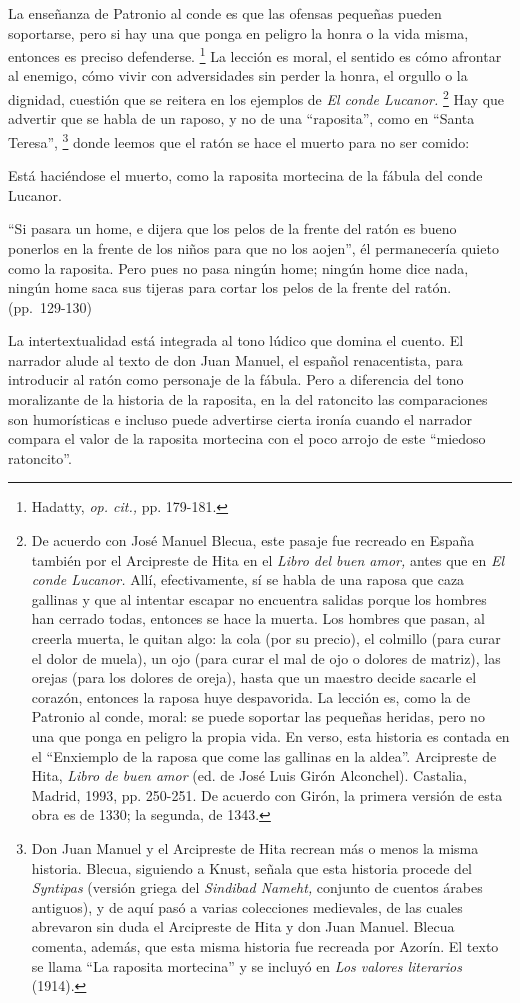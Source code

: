\documentclass[14pt,twoside,final]{extbook} %
\let\oldfootnote\footnote
\renewcommand\footnote[1]{%
\oldfootnote{\hspace{1mm}#1}}
\begin{document}
La enseñanza de Patronio al conde es que las ofensas pequeñas pueden soportarse, pero si hay una que ponga en peligro la honra o la vida misma, entonces es preciso defenderse.\footnote{Hadatty, \emph{op. cit.,} pp. 179-181. } La lección es moral, el sentido es cómo afrontar al enemigo, cómo vivir con adversidades sin perder la honra, el orgullo o la dignidad, cuestión que se reitera en los ejemplos de \emph{El conde Lucanor.}\footnote{De acuerdo con José Manuel Blecua, este pasaje fue recreado en España también por el Arcipreste de Hita en el \emph{Libro del buen amor,} antes que en \emph{El conde Lucanor.} Allí, efectivamente, sí se habla de una raposa que caza gallinas y que al intentar escapar no encuentra salidas porque los hombres han cerrado todas, entonces se hace la muerta. Los hombres que pasan, al creerla muerta, le quitan algo: la cola (por su precio), el colmillo (para curar el dolor de muela), un ojo (para curar el mal de ojo o dolores de matriz), las orejas (para los dolores de oreja), hasta que un maestro decide sacarle el corazón, entonces la raposa huye despavorida. La lección es, como la de Patronio al conde, moral: se puede soportar las pequeñas heridas, pero no una que ponga en peligro la propia vida. En verso, esta historia es contada en el ``Enxiemplo de la raposa que come las gallinas en la aldea''. Arcipreste de Hita, \emph{Libro de buen amor} (ed. de José Luis Girón Alconchel). Castalia, Madrid, 1993, pp. 250-251. De acuerdo con Girón, la primera versión de esta obra es de 1330; la segunda, de 1343.} Hay que advertir que se habla de un raposo, y no de una ``raposita'', como en ``Santa Teresa'',\footnote{Don Juan Manuel y el Arcipreste de Hita recrean más o menos la misma historia. Blecua, siguiendo a Knust, señala que esta historia procede del \emph{Syntipas} (versión griega del \emph{Sindibad Nameht,} conjunto de cuentos árabes antiguos), y de aquí pasó a varias colecciones medievales, de las cuales abrevaron sin duda el Arcipreste de Hita y don Juan Manuel. Blecua comenta, además, que esta misma historia fue recreada por Azorín. El texto se llama ``La raposita mortecina'' y se incluyó en \emph{Los valores literarios} (1914).} donde leemos que el ratón se hace el muerto para no ser comido:
\begin{quoting}
Está haciéndose el muerto, como la raposita mortecina de la fábula del conde Lucanor.

``Si pasara un home, e dijera que los pelos de la frente del ratón es bueno ponerlos en la frente de los niños para que no los aojen'', él permanecería quieto como la raposita. Pero pues no pasa ningún home; ningún home dice nada, ningún home saca sus tijeras para cortar los pelos de la frente del ratón. (pp.~129-130)
\end{quoting}
La intertextualidad está integrada al tono lúdico que domina el cuento. El narrador alude al texto de don Juan Manuel, el español renacentista, para introducir al ratón como personaje de la fábula. Pero a diferencia del tono moralizante de la historia de la raposita, en la del ratoncito las comparaciones son humorísticas e incluso puede advertirse cierta ironía cuando el narrador compara el valor de la raposita mortecina con el poco arrojo de este ``miedoso ratoncito''.
\end{document}
